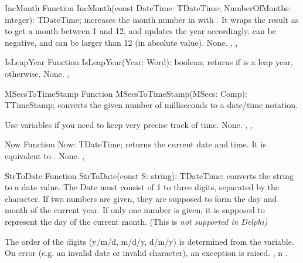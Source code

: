  
\begin{function}{IncMonth}
\Declaration
Function IncMonth(const DateTime: TDateTime; NumberOfMonths: integer): TDateTime;
\Description
{} increases the month number in  with
. It wraps the result as to get a month between 1 and
12, and updates the year accordingly.  can be negative,
and can be larger than 12 (in absolute value).
\Errors
None.
\SeeAlso
{}, , 
\end{function}


\html{}
 
\begin{function}{IsLeapYear}
\Declaration
Function IsLeapYear(Year: Word): boolean;
\Description
{} returns  if  is a leap year,
 otherwise.
\Errors
None.
\SeeAlso
{}, 
\end{function}

\html{}
 
\begin{function}{MSecsToTimeStamp}
\Declaration
Function MSecsToTimeStamp(MSecs: Comp): TTimeStamp;
\Description
{} converts the given number of milliseconds to
a  date/time notation.

Use  variables if you need to keep very precise track of
time.
\Errors
None.
\SeeAlso
{}, , 
\end{function}

\html{}
 
\begin{function}{Now}
\Declaration
Function Now: TDateTime;
\Description
{} returns the current date and time. It is equivalent to 
.
\Errors
None.
\SeeAlso
{}, 
\end{function}

\html{}
 
\begin{function}{StrToDate}
\Declaration
Function StrToDate(const S: string): TDateTime;
\Description
{} converts the string  to a  date 
value. The Date must consist of 1 to three digits, separated by the 
 character. If two numbers are given, they
are supposed to form the day and month of the current year. If only 
one number is given, it is supposed to represent the day of the 
current month. (This is \em{not} supported in Delphi)

The order of the digits (y/m/d, m/d/y, d/m/y) is determined from the 
 variable.
\Errors
On error (e.g. an invalid date or invalid character), 
an  exception is raised.
\SeeAlso
{}, n .
\end{function}

